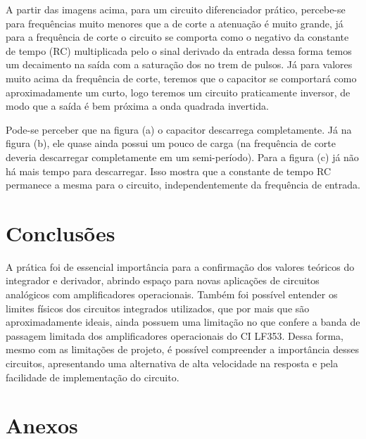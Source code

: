 A partir das imagens acima, para um circuito diferenciador prático, percebe-se para frequências muito menores que a de corte a atenuação é muito grande, já para a frequência de corte o circuito se comporta como o negativo da constante de tempo (RC) multiplicada pelo o sinal derivado da entrada dessa forma temos um decaimento na saída com a saturação dos no trem de pulsos. Já para valores muito acima da frequência de corte, teremos que o capacitor se comportará como aproximadamente um curto, logo teremos um circuito praticamente inversor, de modo que a saída é bem próxima a onda quadrada invertida.   

Pode-se perceber que na figura (a) o capacitor descarrega completamente. Já na figura (b), ele quase ainda possui um pouco de carga (na frequência de corte deveria descarregar completamente em um semi-período). Para a figura (c) já não há mais tempo para descarregar. Isso mostra que a constante de tempo RC permanece a mesma para o circuito, independentemente da frequência de entrada.




\section{Conclusões}

A prática foi de essencial importância para a confirmação dos valores teóricos do integrador e derivador, abrindo espaço para novas aplicações de circuitos analógicos com amplificadores operacionais. Também foi possível entender os limites físicos dos circuitos integrados utilizados, que por mais que são aproximadamente ideais, ainda possuem uma limitação no que confere a banda de passagem limitada dos amplificadores operacionais do CI LF353. Dessa forma, mesmo com as limitações de projeto, é possível compreender a importância desses circuitos, apresentando uma alternativa de alta velocidade na resposta e pela facilidade de implementação do circuito.





\newpage

\section{Anexos}

